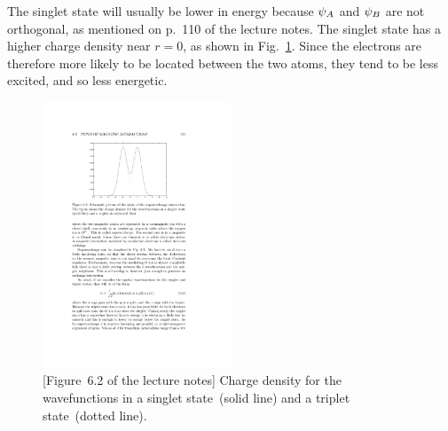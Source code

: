 {	The singlet state will usually be lower in energy because $\psi_A$ and $\psi_B$ are not orthogonal, as mentioned on p.~110 of the lecture notes.  The singlet state has a higher charge density near $r = 0$, as shown in Fig.~\ref{f1}.  Since the electrons are therefore more likely to be located between the two atoms, they tend to be less excited, and so less energetic.
	
	\begin{figure}[t] \centering
		\includegraphics[width=0.5\textwidth,trim=5cm 19cm 7cm 4.5cm,clip]{6-2}
		\caption{[Figure~6.2 of the lecture notes] Charge density for the wavefunctions in a singlet state~(solid line) and a triplet state~(dotted line).}
		\label{f1}
	\end{figure}
}